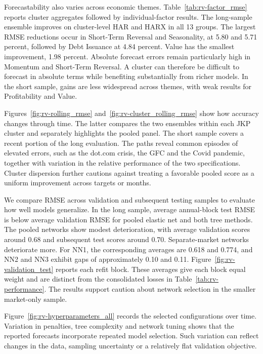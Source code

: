 \documentclass[preprint,12pt,authoryear]{elsarticle}
\begin{document}
Forecastability also varies across economic themes. Table~\ref{tab:rv-factor_rmse} reports cluster aggregates followed by individual-factor results. The long-sample ensemble improves on cluster-level HAR and HARX in all 13 groups. The largest RMSE reductions occur in Short-Term Reversal and Seasonality, at 5.80 and 5.71 percent, followed by Debt Issuance at 4.84 percent. Value has the smallest improvement, 1.98 percent. Absolute forecast errors remain particularly high in Momentum and Short-Term Reversal. A cluster can therefore be difficult to forecast in absolute terms while benefiting substantially from richer models. In the short sample, gains are less widespread across themes, with weak results for Profitability and Value.

Figures~\ref{fig:rv-rolling_rmse} and~\ref{fig:rv-cluster_rolling_rmse} show how accuracy changes through time. The latter compares the two ensembles within each JKP cluster and separately highlights the pooled panel. The short sample covers a recent portion of the long evaluation. The paths reveal common episodes of elevated errors, such as the dot.com crisis, the GFC and the Covid pandemic, together with variation in the relative performance of the two specifications. Cluster dispersion further cautions against treating a favorable pooled score as a uniform improvement across targets or months.

We compare RMSE across validation and subsequent testing samples to evaluate how well models generalize. In the long sample, average annual-block test RMSE is below average validation RMSE for pooled elastic net and both tree methods. The pooled networks show modest deterioration, with average validation scores around 0.68 and subsequent test scores around 0.70. Separate-market networks deteriorate more. For NN1, the corresponding averages are 0.618 and 0.774, and NN2 and NN3 exhibit gaps of approximately 0.10 and 0.11. Figure~\ref{fig:rv-validation_test} reports each refit block. These averages give each block equal weight and are distinct from the consolidated losses in Table~\ref{tab:rv-performance}. The results support caution about network selection in the smaller market-only sample.

Figure~\ref{fig:rv-hyperparameters_all} records the selected configurations over time. Variation in penalties, tree complexity and network tuning shows that the reported forecasts incorporate repeated model selection. Such variation can reflect changes in the data, sampling uncertainty or a relatively flat validation objective.  
\end{document}
